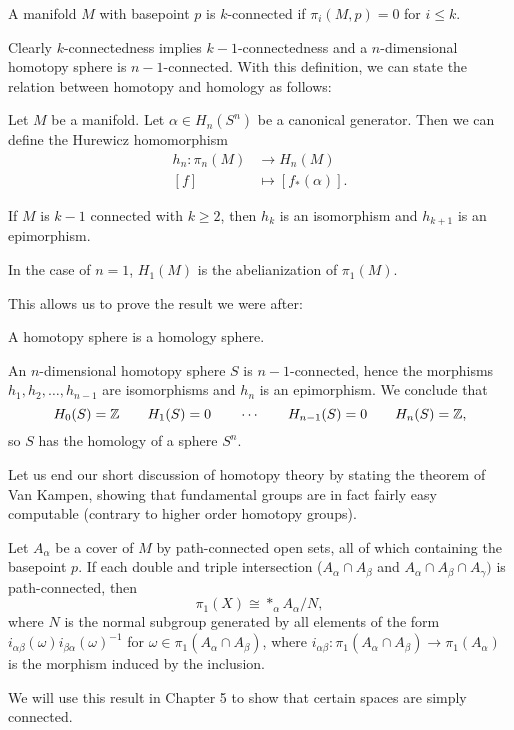 \begin{definition}[$k$-connected]
    A manifold $M$ with basepoint $p$ is $k$-connected if  $\pi_i(M, p) = 0$ for  $i \le  k$.
\end{definition}
Clearly $k$-connectedness implies  $k-1$-connectedness and a $n$-dimensional homotopy sphere is $n-1$-connected.
With this definition, we can state the relation between homotopy and homology as follows:
\begin{theorem}
    Let $M$ be a manifold.
    Let $\alpha \in H_n(S^{n})$ be a canonical generator.
    Then we can define the Hurewicz homomorphism
    \begin{align*}
        h_n: \pi_n(M) &\longrightarrow H_n(M) \\
        [f] &\longmapsto [f_*(\alpha)]
    .\end{align*}

    If $M$ is  $k-1$ connected with  $k\ge 2$, then $h_k$ is an isomorphism and $h_{k+1}$ is an epimorphism.
\end{theorem}
\begin{remark}
    In the case of $n=1$, $H_1(M)$ is the abelianization of $\pi_1(M)$.
\end{remark}
This allows us to prove the result we were after:
\begin{prop}
    A homotopy sphere is a homology sphere.
\end{prop}
\begin{myproof}
    An $n$-dimensional homotopy sphere $S$ is $n-1$-connected, hence the morphisms $h_1, h_2, \ldots, h_{n-1}$ are isomorphisms and $h_n$ is an epimorphism.
    We conclude that 
    \[
        H_0(S) = \mathbb{Z} \qquad
        H_1(S) = 0 \qquad 
        \cdots \qquad
        H_{n-1}(S) = 0 \qquad 
        H_{n}(S) = \mathbb{Z}
    ,\] 
    so $S$ has the homology of a sphere  $S^{n}$.
\end{myproof}

Let us end our short discussion of homotopy theory by stating the theorem of Van Kampen, showing that fundamental groups are in fact fairly easy computable (contrary to higher order homotopy groups).
\begin{theorem}
    Let $A_\alpha$ be a cover of $M$ by path-connected open sets, all of which containing the basepoint $p$.
    If each double and triple intersection ($A_\alpha \cap A_\beta$ and $A_\alpha \cap A_\beta \cap A_\gamma)$ is path-connected, then
    \[
        \pi_1(X) \cong *_{\alpha} A_\alpha / N
    ,\] 
    where $N$ is the normal subgroup generated by all elements of the form  $i_{\alpha \beta}(\omega) i_{\beta \alpha}(\omega)^{-1}$ for $\omega \in \pi_1(A_\alpha \cap A_\beta)$, where $i_{\alpha\beta}: \pi_1(A_\alpha \cap A_\beta) \to  \pi_1(A_\alpha)$ is the morphism induced by the inclusion.
\end{theorem}

We will use this result in Chapter 5 to show that certain spaces are simply connected.
